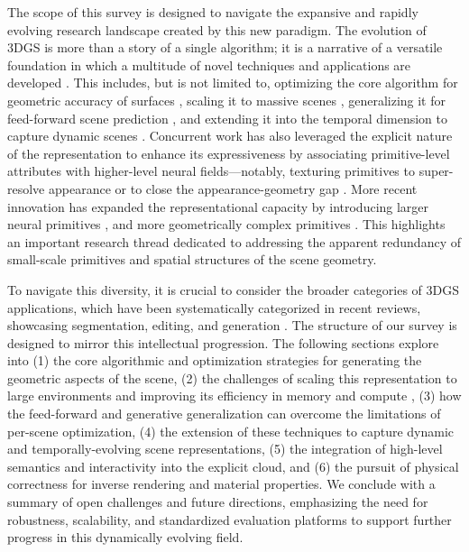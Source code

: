 \documentclass[11pt,a4paper]{article}
\begin{document}
The scope of this survey is designed to navigate the expansive and rapidly evolving research landscape created by this new paradigm. The evolution of 3DGS is more than a story of a single algorithm; it is a narrative of a versatile foundation in which a multitude of novel techniques and applications are developed \cite{arxiv:2510.26694v1,arxiv:2402.07181v1}. This includes, but is not limited to, optimizing the core algorithm for geometric accuracy of surfaces \cite{arxiv:2403.17888v1,arxiv:2411.14974v3}, scaling it to massive scenes \cite{arxiv:2406.12080v1}, generalizing it for feed-forward scene prediction \cite{arxiv:2605.07287v2}, and extending it into the temporal dimension to capture dynamic scenes \cite{arxiv:2412.20720v2}. Concurrent work has also leveraged the explicit nature of the representation to enhance its expressiveness by associating primitive-level attributes with higher-level neural fields---notably, texturing primitives to super-resolve appearance \cite{arxiv:2409.12954v1} or to close the appearance-geometry gap \cite{arxiv:2511.18873v1,arxiv:2506.13348v2}. More recent innovation has expanded the representational capacity by introducing larger neural primitives \cite{arxiv:2510.08491v2,arxiv:2606.03877v1}, and more geometrically complex primitives \cite{arxiv:2411.08508v4}. This highlights an important research thread dedicated to addressing the apparent redundancy of small-scale primitives and spatial structures of the scene geometry.

To navigate this diversity, it is crucial to consider the broader categories of 3DGS applications, which have been systematically categorized in recent reviews, showcasing segmentation, editing, and generation \cite{arxiv:2508.09977v5,arxiv:2401.03890v2}. The structure of our survey is designed to mirror this intellectual progression. The following sections explore into (1) the core algorithmic and optimization strategies for generating the geometric aspects of the scene, (2) the challenges of scaling this representation to large environments and improving its efficiency in memory and compute \cite{arxiv:2502.19457v1}, (3) how the feed-forward and generative generalization can overcome the limitations of per-scene optimization, (4) the extension of these techniques to capture dynamic and temporally-evolving scene representations, (5) the integration of high-level semantics and interactivity into the explicit cloud, and (6) the pursuit of physical correctness for inverse rendering and material properties. We conclude with a summary of open challenges and future directions, emphasizing the need for robustness, scalability, and standardized evaluation platforms to support further progress in this dynamically evolving field.
\end{document}
